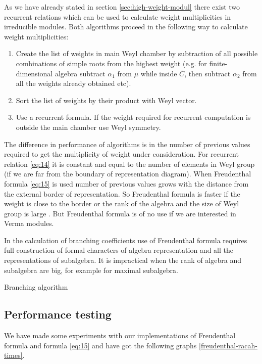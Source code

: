 \documentclass[preprint,12pt]{elsarticle}
\begin{document}
As we have already stated in section \ref{sec:high-weight-modul} there exist two recurrent relations which can be used to calculate weight multiplicities in irreducible modules. Both algorithms proceed in the following way to calculate weight multiplicities:
\begin{enumerate}
\item Create the list of weights in main Weyl chamber by subtraction of all possible combinations of simple roots from the highest weight (e.g. for finite-dimensional algebra subtract $\alpha_{1}$ from $\mu$ while inside $\bar C$, then subtract $\alpha_{2}$ from all the weights already obtained etc).
\item Sort the list of weights by their product with Weyl vector.
\item Use a recurrent formula. If the weight required for recurrent computation is outside the main chamber use Weyl symmetry. 
\end{enumerate}
The difference in performance of algorithms is in the number of previous values required to get the multiplicity of weight under consideration. For recurrent relation \eqref{eq:14} it is constant and equal to the number of elements in Weyl group (if we are far from the boundary of representation diagram). When Freudenthal formula \eqref{eq:15} is used number of previous values grows with the distance from the external border of representation. So Freudenthal formula is faster if the weight is close to the border or the rank of the algebra and the size of Weyl group is large \cite{moody1982fast}. 
But Freudenthal formula is of no use if we are interested in Verma modules. 

In the calculation of branching coefficients use of Freudenthal formula requires full construction of formal characters of algebra representation and all the representations of subalgebra. It is impractical when the rank of algebra and subalgebra are big, for example for maximal subalgebra.

Branching algorithm \cite{2010arXiv1007.0318L}
\subsection{Performance testing}
\label{sec:performance-testing}

We have made some experiments with our implementations of Freudenthal formula and formula \eqref{eq:15} and have got the following graphs \ref{freudenthal-racah-times}.
\end{document}
